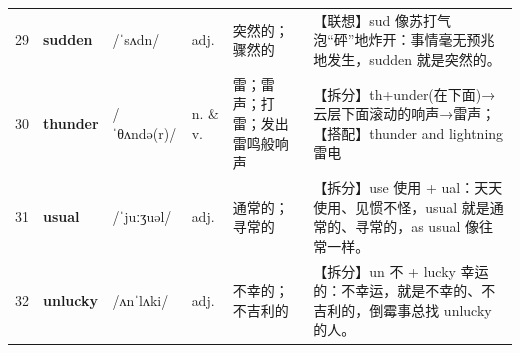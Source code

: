 \documentclass[UTF8,a4paper,11pt,oneside]{ctexbook}
\newcommand{\cellword}[1]{{\bfseries\textcolor{wordcol}{#1}}}
\newcommand{\cellipa}[1]{{\footnotesize\textcolor{ipacol}{#1}}}
\newcommand{\cellpos}[1]{\textcolor{poscol}{#1}}
\newcommand{\cellno}[1]{\textcolor{volcolor!75!black}{#1}}
\begin{document}
{\begin{longtable}{@{}C{0.045\textwidth}L{0.155\textwidth}L{0.175\textwidth}C{0.070\textwidth}L{0.180\textwidth}L{0.282\textwidth}@{}}
 \cellno{29} & \cellword{sudden} & \cellipa{/ˈsʌdn/} & \cellpos{adj.} & 突然的；骤然的 & \textcolor{tagAssoc}{【联想】}sud 像苏打气泡“砰”地炸开：事情毫无预兆地发生，sudden 就是突然的。 \\
\cellno{30} & \cellword{thunder} & \cellipa{/ˈθʌndə(r)/} & \cellpos{n.  \& v.} & 雷；雷声；打雷；发出雷鸣般响声 & \textcolor{tagSplit}{【拆分】}th+under(在下面)→\allowbreak{}云层下面滚动的响声→\allowbreak{}雷声；\textcolor{tagColloc}{【搭配】}thunder and lightning 雷电 \\
 \cellno{31} & \cellword{usual} & \cellipa{/ˈjuːʒuəl/} & \cellpos{adj.} & 通常的；寻常的 & \textcolor{tagSplit}{【拆分】}use 使用 + ual：天天使用、见惯不怪，usual 就是通常的、寻常的，as usual 像往常一样。 \\
\cellno{32} & \cellword{unlucky} & \cellipa{/ʌnˈlʌki/} & \cellpos{adj.} & 不幸的；不吉利的 & \textcolor{tagSplit}{【拆分】}un 不 + lucky 幸运的：不幸运，就是不幸的、不吉利的，倒霉事总找 unlucky 的人。 \\
\end{longtable}
}

\end{document}
